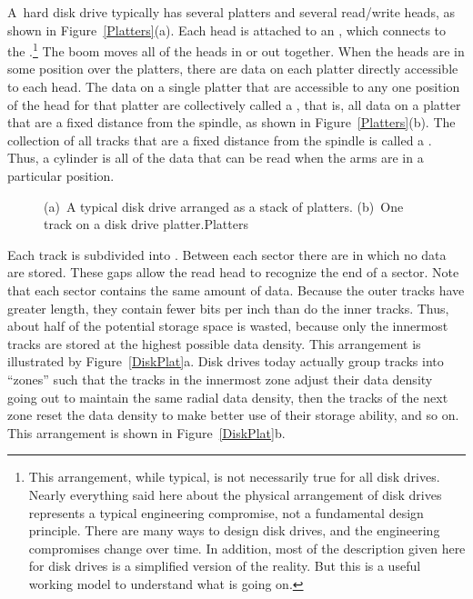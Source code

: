 A~hard disk drive typically has several platters and
several read/write heads, as shown in Figure~\ref{Platters}(a).
Each head is  attached to an , which connects to the
.\footnote{
This arrangement, while typical, is not necessarily true for all disk
drives.
Nearly everything said here about the physical arrangement of disk
drives represents a typical engineering compromise, not a fundamental
design principle.
There are many ways to design disk drives, and the engineering
compromises change over time.
In addition, most of the description given here for disk drives is a
simplified version of the reality.
But this is a useful working model to understand what is going on.}
The boom moves all of the heads in or out together.
When the heads are in some position over the platters, there are data
on each platter directly accessible to each head.
The data on a single platter that are accessible to any one position
of the head for that platter are collectively called a ,
that is, all data on a platter that are a fixed distance from the
spindle, as shown in Figure~\ref{Platters}(b).
The collection of all tracks that are a fixed distance from the
spindle is called a .
Thus, a cylinder is all of the data that can be read when the arms
are in a particular position.

\begin{figure}
\vspace{-\bigskipamount}\vspace{-\bigskipamount}

{(a)~A typical disk drive arranged as a stack of platters.
(b)~One track on a disk drive platter.}{Platters}
\medskip
\end{figure}

Each track is subdivided into .
Between each sector there are 
in which no data are stored.
These gaps allow the read head to recognize the end of a  sector.
Note that each sector contains the same amount of data.
Because the outer tracks have greater length, they contain fewer
bits per inch than do the inner tracks.
Thus, about half of the potential storage space is wasted, because only
the innermost tracks are stored at the highest possible data
density.
This arrangement is illustrated by Figure~\ref{DiskPlat}a.
Disk drives today actually group tracks into
``zones'' such that the tracks in the innermost zone adjust their data
density going out to maintain the same radial data density, then the
tracks of the next zone reset the data density to make better use of
their storage ability, and so on.
This arrangement is shown in Figure~\ref{DiskPlat}b.

